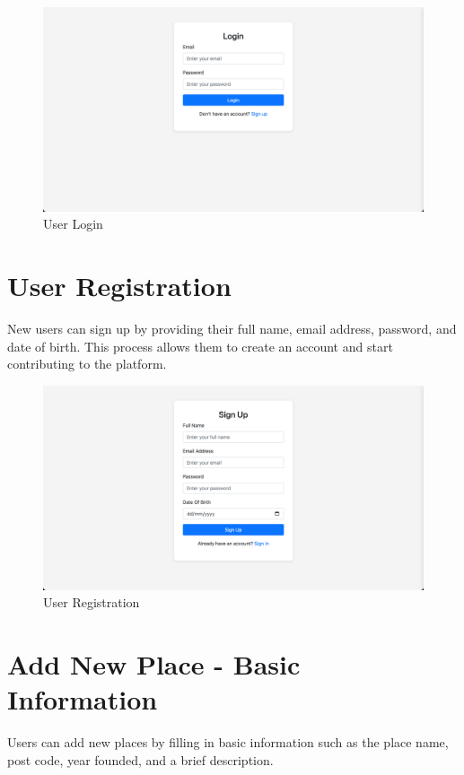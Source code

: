 \begin{figure}[H]
    \centering
    \includegraphics[width=\textwidth]{login.png}
    \caption{User Login}
    \label{fig:login}
\end{figure}

\section{User Registration}
New users can sign up by providing their full name, email address, password, and date of birth. This process allows them to create an account and start contributing to the platform.

\begin{figure}[H]
    \centering
    \includegraphics[width=\textwidth]{signup.png}
    \caption{User Registration}
    \label{fig:signup}
\end{figure}

\section{Add New Place - Basic Information}
Users can add new places by filling in basic information such as the place name, post code, year founded, and a brief description.

